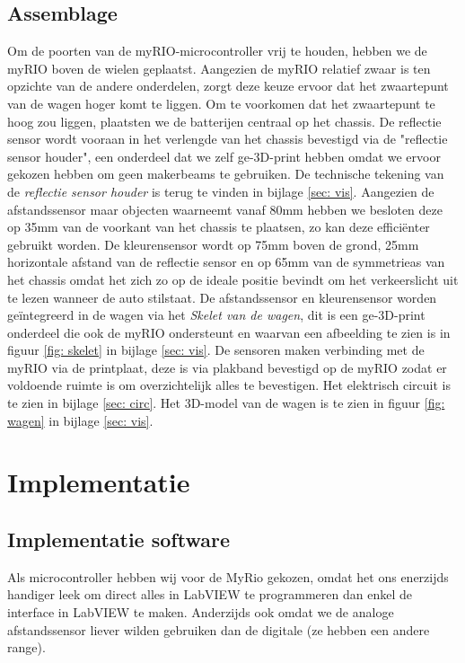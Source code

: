 \documentclass[a4paper,twoside,kulak]{kulakreport}
\begin{document}
	\subsection{Assemblage}
	Om de poorten van de myRIO-microcontroller vrij te houden, hebben we de myRIO boven de wielen geplaatst. Aangezien de myRIO relatief zwaar is ten opzichte van de andere onderdelen, zorgt deze keuze ervoor dat het zwaartepunt van de wagen hoger komt te liggen. Om te voorkomen dat het zwaartepunt te hoog zou liggen, plaatsten we de batterijen centraal op het chassis. De reflectie sensor wordt vooraan in het verlengde van het chassis bevestigd via de "reflectie sensor houder", een onderdeel dat we zelf ge-3D-print hebben omdat we ervoor gekozen hebben om geen makerbeams te gebruiken. De technische tekening van de \textit{reflectie sensor houder} is terug te vinden in bijlage \ref{sec: vis}. Aangezien de afstandssensor maar objecten waarneemt vanaf 80mm hebben we besloten deze op 35mm van de voorkant van het chassis te plaatsen, zo kan deze efficiënter gebruikt worden. De kleurensensor wordt op 75mm boven de grond, 25mm horizontale afstand van de reflectie sensor en op 65mm van de symmetrieas van het chassis omdat het zich zo op de ideale positie bevindt om het verkeerslicht uit te lezen wanneer de auto stilstaat. De afstandssensor en kleurensensor worden geïntegreerd in de wagen via het \textit{Skelet van de wagen}, dit is een ge-3D-print onderdeel die ook de myRIO ondersteunt en waarvan een afbeelding te zien is in figuur \ref{fig: skelet} in bijlage \ref{sec: vis}. De sensoren maken verbinding met de myRIO via de printplaat, deze is via plakband bevestigd op de myRIO zodat er voldoende ruimte is om overzichtelijk alles te bevestigen. Het elektrisch circuit is te zien in bijlage \ref{sec: circ}. Het 3D-model van de wagen is te zien in figuur \ref{fig: wagen} in bijlage \ref{sec: vis}.
	
	
	\section{Implementatie}

	\subsection{Implementatie software}
	Als microcontroller hebben wij voor de MyRio gekozen, omdat het ons enerzijds handiger leek om direct alles in LabVIEW te programmeren dan enkel de interface in LabVIEW te maken. Anderzijds ook omdat we de analoge afstandssensor liever wilden gebruiken dan de digitale (ze hebben een andere range).
	
\end{document}
